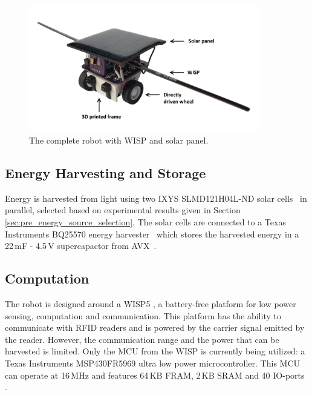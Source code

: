 \begin{figure}[h!]
	\centering
	\includegraphics[width=0.9\textwidth]{pics/tp_robot2.png}
	\caption{The complete robot with WISP and solar panel.}
	\label{fig:robot_picture}
\end{figure}

\subsection{Energy Harvesting and Storage}
Energy is harvested from light using two IXYS SLMD121H04L-ND solar cells~\cite{ixolar_slmd121h04l_2017} in parallel, selected based on experimental results given in Section \ref{sec:pre_energy_source_selection}.
The solar cells are connected to a Texas Instruments BQ25570 energy harvester~\cite{bq25570_2017} which stores the harvested energy in a 22\,mF - 4.5\,V supercapactor from AVX~\cite{avx_bestcap_2017}.

\subsection{Computation}
\label{sec:dai_computation}

The robot is designed around a WISP5 \cite{wisp5_wiki_2017}, a battery-free platform for low power sensing, computation and communication.
This platform has the ability to communicate with RFID readers and is powered by the carrier signal emitted by the reader.
However, the communication range and the power that can be harvested is limited. 
Only the MCU from the WISP is currently being utilized: a Texas Instruments MSP430FR5969 ultra low power microcontroller.
This MCU can operate at 16\,MHz and features 64\,KB FRAM, 2\,KB SRAM and 40 IO-ports \cite{msp430fr5969_2017}.


